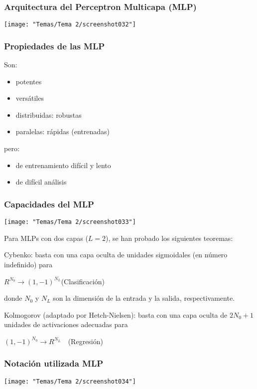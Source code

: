 \subsubsection{Arquitectura del Perceptron Multicapa (MLP)}
\begin{center}
	\texttt{[image: "Temas/Tema 2/screenshot032"]}
\end{center}
\subsubsection{Propiedades de las MLP}
Son:
\begin{itemize}
	\item potentes
	\item versátiles
	\item distribuidas: robustas
	\item paralelas: rápidas (entrenadas)
\end{itemize}
pero:
\begin{itemize}
	\item de entrenamiento difícil y lento
	\item de difícil análisis
\end{itemize}
\subsubsection{Capacidades del MLP}
\begin{center}
	\texttt{[image: "Temas/Tema 2/screenshot033"]}
\end{center}
Para MLPs con dos capas ($L = 2$), se han probado los siguientes teoremas:

Cybenko: basta con una capa oculta de unidades sigmoidales (en número indefinido) para \begin{center}
	$R^{N_0}\longrightarrow(1,-1)^{N_L}$\quad(Clasificación)
\end{center} donde $N_0$ y $N_L$ son la dimensión de la entrada y la salida, respectivamente.

Kolmogorov (adaptado por Hetch-Nielsen): basta con una capa oculta de $2N_0 + 1$ unidades de activaciones adecuadas para \begin{center}
	$(1,-1)^{N_0}\longrightarrow R^{N_L}\quad$(Regresión)
\end{center}
\subsubsection{Notación utilizada MLP}
\begin{center}
	\texttt{[image: "Temas/Tema 2/screenshot034"]}
\end{center}
